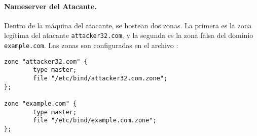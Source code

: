 \paragraph{Nameserver del Atacante.}
Dentro de la máquina del atacante, se hostean dos zonas. La primera es la zona legítima del atacante \texttt{attacker32.com}, y la segunda es la zona falsa del dominio \texttt{example.com}. Las zonas son configuradas en el archivo :

\begin{lstlisting}
zone "attacker32.com" {
        type master;
        file "/etc/bind/attacker32.com.zone";
};

zone "example.com" {
        type master;
        file "/etc/bind/example.com.zone";
};
\end{lstlisting}


